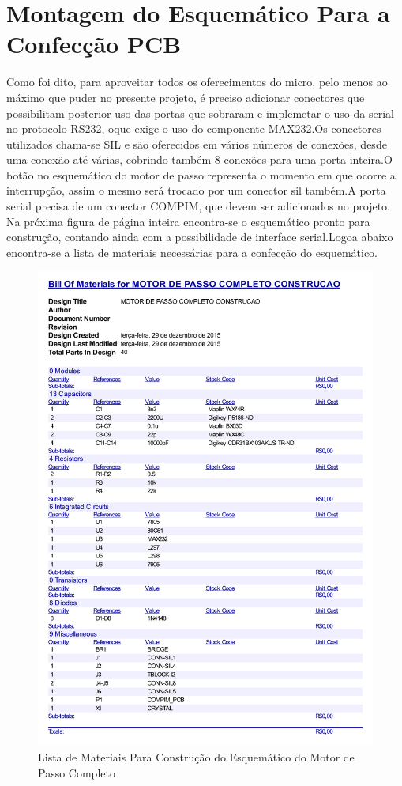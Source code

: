 \documentclass{Fabiano_file}
\begin{document}
{\section{Montagem do Esquemático Para a Confecção PCB}
Como foi dito, para aproveitar todos os oferecimentos do micro, pelo menos ao máximo que puder no presente projeto, é preciso adicionar conectores que possibilitam
posterior uso das portas que sobraram e implemetar o uso da serial no protocolo RS232, oque exige o uso do componente MAX232.Os conectores utilizados chama-se SIL
e são oferecidos em vários números de conexões, desde uma conexão até várias, cobrindo também 8 conexões para uma porta inteira.O botão no esquemático do motor
de passo representa o momento em que ocorre a interrupção, assim o mesmo será trocado por um conector sil também.A porta serial precisa de um conector COMPIM, que 
devem ser adicionados no projeto.\\
Na próxima figura de página inteira encontra-se o esquemático pronto para construção, contando ainda com a possibilidade de interface serial.Logoa abaixo encontra-se
a lista de materiais necessárias para a confecção do esquemático.

\begin{figure}[h!]
\centering
\includegraphics[width=.7\textwidth]{lista_de_materiais_completa.pdf}
\caption{Lista de Materiais Para Construção do Esquemático do Motor de Passo Completo}
\label{fig:lista_de_materiais}
\end{figure}

}
\end{document}
